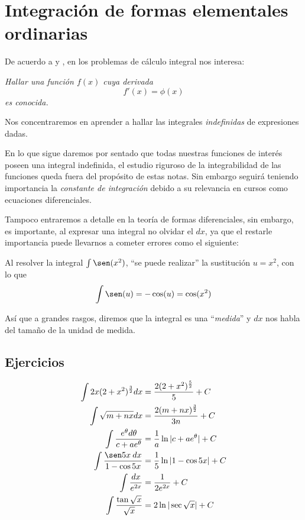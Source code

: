 \section{Integración de formas elementales ordinarias}

De acuerdo a \cite{aguilar_matematicas_2009} y , en los problemas de cálculo integral nos interesa:

\textsl{Hallar una función $f(x)$ cuya derivada}
$$f'(x)=\phi(x)$$
\textsl{es conocida.}

Nos concentraremos en aprender a hallar las integrales \textsl{indefinidas} de expresiones dadas.

En lo que sigue daremos por sentado que todas nuestras funciones de interés poseen una integral indefinida, el estudio riguroso de la integrabilidad de las funciones queda fuera del propósito de estas notas. Sin embargo seguirá teniendo importancia la \textsl{constante de integración} debido a su relevancia en cursos como ecuaciones diferenciales.

Tampoco entraremos a detalle en la teoría de formas diferenciales, sin embargo, es importante, al expresar una integral no olvidar el $dx$, ya que el restarle importancia puede llevarnos a cometer errores como el siguiente:

Al resolver la integral $\int\sen(x^2)$, ``se puede realizar'' la sustitución $u=x^2$, con lo que $$\int\sen(u)=-\cos(u)=\cos(x^2)$$

Así que a grandes rasgos, diremos que la integral es una ``\textsl{medida}'' y $dx$ nos habla del tamaño de la unidad de medida.






\subsection{Ejercicios}
\begin{align}
	\int 2x(2+x^2)^{\frac{3}{2}}dx&=\frac{2(2+x^2)^{\frac{5}{2}}}{5}+C\\
	\int \sqrt{m+nx} dx&=\frac{2(m+nx)^{\frac{3}{2}}}{3n}+C\\
	\int \frac{e^{\theta} d\theta}{c+ae^{\theta}}&=\frac{1}{a}\ln |c+ae^{\theta}|+C\\
	\int \frac{\sen 5x\:dx}{1-\cos 5x}&=\frac{1}{5}\ln|1-\cos 5x|+C\\
	\int \frac{dx}{e^{2x}}&=\frac{1}{2e^{2x}}+C\label{ejercicio2.5.1}\\
	\int \frac{\tan\sqrt{x}}{\sqrt x}&=2\ln|\sec{\sqrt x}|+C
\end{align}
